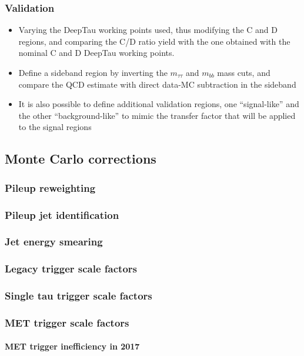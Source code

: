 \documentclass[11pt]{article}
\begin{document}
\subsubsection{Validation}
\label{sec:org3da393e}
\begin{itemize}
\item Varying the DeepTau working points used, thus modifying the C and D regions, and comparing the C/D ratio yield with the one obtained with the nominal C and D DeepTau working points.
\item Define a sideband region by inverting the \(m_{\tau\tau}\) and \(m_{bb}\) mass cuts, and compare the QCD estimate with direct data-MC subtraction in the sideband
\item It is also possible to define additional validation regions, one ``signal-like'' and the other ``background-like'' to mimic the transfer factor that will be applied to the signal regions
\end{itemize}
\subsection{Monte Carlo corrections}
\label{sec:orgc476f46}
\subsubsection{Pileup reweighting}
\label{sec:org66e5fba}
\subsubsection{Pileup jet identification}
\label{sec:org1c4be3b}
\subsubsection{Jet energy smearing}
\label{sec:orgcab1f78}
\subsubsection{Legacy trigger scale factors}
\label{sec:org171b9ec}
\subsubsection{Single tau trigger scale factors}
\label{sec:org3deceef}
\subsubsection{MET trigger scale factors}
\label{sec:org0e42c1f}
\paragraph{MET trigger inefficiency in 2017}
\end{document}
